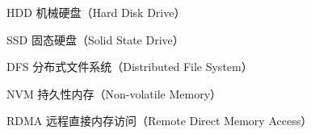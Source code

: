 
\begin{denotation}[3cm]
\item[HDD]  机械硬盘（Hard Disk Drive）
\item[SSD]  固态硬盘（Solid State Drive）
\item[DFS]  分布式文件系统（Distributed File System）
\item[NVM]  持久性内存（Non-volatile Memory）
\item[RDMA] 远程直接内存访问（Remote Direct Memory Access）
\end{denotation}
